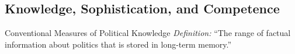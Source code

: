 

\subsection{Knowledge, Sophistication, and Competence}

\begin{frame}{Conventional Measures of Political Knowledge}
\emph{Definition:} ``The range of factual information about politics that is stored in long-term memory.'' {\footnotesize\cite[10]{carpini1996americans}}
\\\vspace{1em}
\\\vspace{2em}
\\\vspace{1em}
\end{frame}

